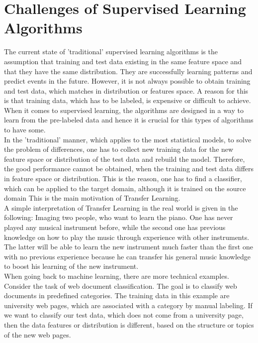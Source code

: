 \section{Challenges of Supervised Learning Algorithms}\label{TlSecChal}
The current state of 'traditional' supervised learning algorithms is the assumption that training and test data existing in the same feature space and that they have the same distribution.
They are successfully learning patterns and predict events in the future.
However, it is not always possible to obtain training and test data, which matches in distribution or features space.
A reason for this is that training data, which has to be labeled, is expensive or difficult to achieve.\cite[p. 1]{Weiss.2016}\\
When it comes to supervised learning, the algorithms are designed in a way to learn from the pre-labeled data and hence it is crucial for this types of algorithms to have some.\cite[p. 6-7]{Theodoridis.2008}\\
In the 'traditional' manner, which applies to the most statistical models, to solve the problem of differences, one has to collect new training data for the new feature space or distribution of the test data and rebuild the model.\cite{Pan.2010}
Therefore, the good performance cannot be obtained, when the training and test data differs in feature space or distribution.
This is the reason, one has to find a classifier, which can be applied to the target domain, although it is trained on the source domain
This is the main motivation of Transfer Learning.\cite[p. 1.]{Weiss.2016}\\
A simple interpretation of Transfer Learning in the real world is given in the following:
Imaging two people, who want to learn the piano.
One has never played any musical instrument before, while the second one has previous knowledge on how to play the music through experience with other instruments.
The latter will be able to learn the new instrument much faster than the first one with no previous experience because he can transfer his general music knowledge to boost his learning of the new instrument.\cite[p. 1]{Weiss.2016}\\
When going back to machine learning, there are more technical examples.
Consider the task of web document classification.
The goal is to classify web documents in predefined categories.
The training data in this example are university web pages, which are associated with a category by manual labeling.
If we want to classify our test data, which does not come from a university page, then the data features or distribution is different, based on the structure or topics of the new web pages.
